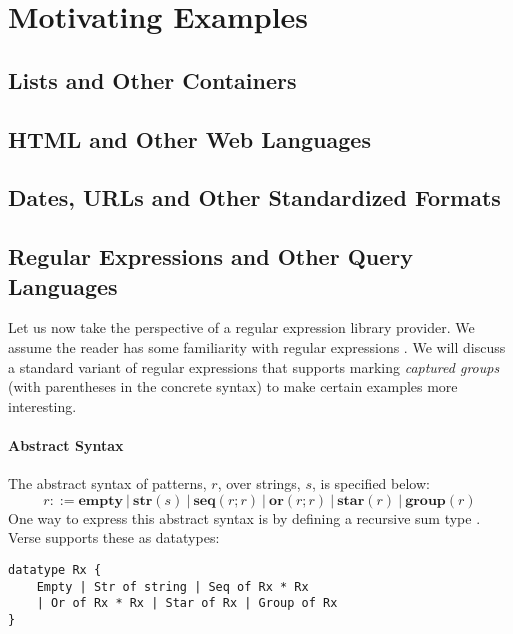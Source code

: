 
\section{Motivating Examples}\label{sec:motivating-examples}
\subsection{Lists and Other Containers}\label{sec:syntax-examples-lists}
\subsection{HTML and Other Web Languages}\label{sec:syntax-examples-html}
\subsection{Dates, URLs and Other Standardized Formats}\label{sec:syntax-examples-dates}
\subsection{Regular Expressions and Other Query Languages}\label{sec:syntax-examples-regexps}
Let us now take the perspective of a regular expression library provider. We assume the reader has some familiarity with regular expressions \cite{Thompson:1968:PTR:363347.363387}. We will discuss a standard variant of regular expressions that supports marking \emph{captured groups} (with parentheses in the concrete syntax) to make certain examples more interesting.

\paragraph{Abstract Syntax} The abstract syntax of {patterns}, $r$, over strings, $s$, is specified below:\[r ::= \textbf{empty} ~|~ \textbf{str}(s) ~|~ \textbf{seq}(r; r) ~|~ \textbf{or}(r; r) ~|~ \textbf{star}(r) ~|~ \textbf{group}(r)\]
One way to express this abstract syntax is by defining a recursive sum type \cite{pfpl}. Verse supports these as datatypes:

\begin{lstlisting}[numbers=none]
datatype Rx {
    Empty | Str of string | Seq of Rx * Rx 
    | Or of Rx * Rx | Star of Rx | Group of Rx
}
\end{lstlisting}

